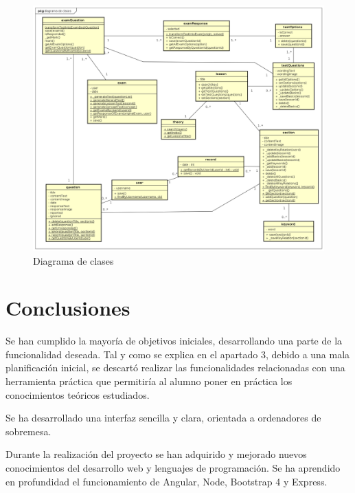 \documentclass[openright,twoside,10pt]{book}
\begin{document}
    \begin{figure}[H]
        \begin{center}
            \includegraphics[width=\textwidth, angle=-90]{img/astah/disenio/clases/clases.png}
        \end{center}
        \caption{Diagrama de clases}
    \end{figure}
    
    \vspace*{\fill} \newpage
    
    \chapter{ Conclusiones }
    
    Se han cumplido la mayoría de objetivos iniciales, desarrollando una
    parte de la funcionalidad deseada. Tal y como se explica en el apartado
    3, debido a una mala planificación inicial, se descartó realizar las
    funcionalidades relacionadas con una herramienta práctica que permitiría
    al alumno poner en práctica los conocimientos teóricos estudiados.
    
    Se ha desarrollado una interfaz sencilla y clara, orientada a
    ordenadores de sobremesa.
    
    Durante la realización del proyecto se han adquirido y mejorado nuevos
    conocimientos del desarrollo web y lenguajes de programación. Se ha
    aprendido en profundidad el funcionamiento de Angular, Node, Bootstrap 4
    y Express.
    
\end{document}
